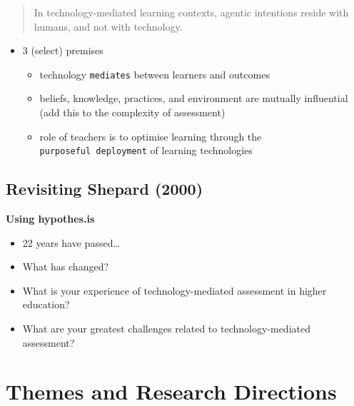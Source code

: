 \documentclass[
]{book}
\providecommand{\tightlist}{%
  \setlength{\itemsep}{0pt}\setlength{\parskip}{0pt}}
\begin{document}
\begin{quote}
In technology-mediated learning contexts, agentic intentions reside with humans, and not with technology.
\end{quote}

\begin{itemize}
\tightlist
\item
  3 (select) premises

  \begin{itemize}
  \tightlist
  \item
    technology \texttt{mediates} between learners and outcomes\\
  \item
    beliefs, knowledge, practices, and environment are mutually influential (add this to the complexity of assessment)\\
  \item
    role of teachers is to optimise learning through the \texttt{purposeful\ deployment} of learning technologies
  \end{itemize}
\end{itemize}

\hypertarget{revisiting-shepard-2000}{%
\subsection*{Revisiting Shepard (2000)}\label{revisiting-shepard-2000}}

\textbf{Using hypothes.is}

\begin{itemize}
\tightlist
\item
  22 years have passed\ldots{}\\
\item
  What has changed?\\
\item
  What is your experience of technology-mediated assessment in higher education?\\
\item
  What are your greatest challenges related to technology-mediated assessment?
\end{itemize}

\hypertarget{themes-and-research-directions}{%
\section*{Themes and Research Directions}\label{themes-and-research-directions}}
\end{document}
